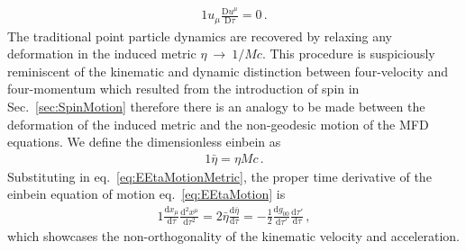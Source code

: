 \begin{alignat}{1}
	\label{eq:EEtaMotionOrtho}u_{\mu}\frac{\mathrm{D}u^{\mu}}{\mathrm{D}\tau}=0\,.
\end{alignat}
The traditional point particle dynamics are recovered by relaxing any deformation in the induced metric $\eta~\rightarrow~1/Mc$. This procedure is suspiciously reminiscent of the kinematic and dynamic distinction between four-velocity and four-momentum which resulted from the introduction of spin in Sec.~\ref{sec:SpinMotion} therefore there is an analogy to be made between the deformation of the induced metric and the non-geodesic motion of the MFD equations. We define the dimensionless einbein as
\begin{alignat}{1}
	\label{eq:EDimensionlessEta}\bar{\eta}=\eta Mc\,.
\end{alignat}
Substituting in eq.~\eqref{eq:EEtaMotionMetric}, the proper time derivative of the einbein equation of motion eq.~\eqref{eq:EEtaMotion} is
\begin{alignat}{1}
	\label{eq:EEtaProperTime}\frac{\mathrm{d}x_{\mu}}{\mathrm{d}\tau}\frac{\mathrm{d}^{2}x^{\mu}}{\mathrm{d}\tau^{2}}=2\bar{\eta}\frac{\mathrm{d}\bar{\eta}}{\mathrm{d}\tau}=-\frac{1}{2}\frac{\mathrm{d}g_{00}}{\mathrm{d}\tau'}\frac{\mathrm{d}\tau'}{\mathrm{d}\tau}\,,
\end{alignat}
which showcases the non-orthogonality of the kinematic velocity and acceleration.


